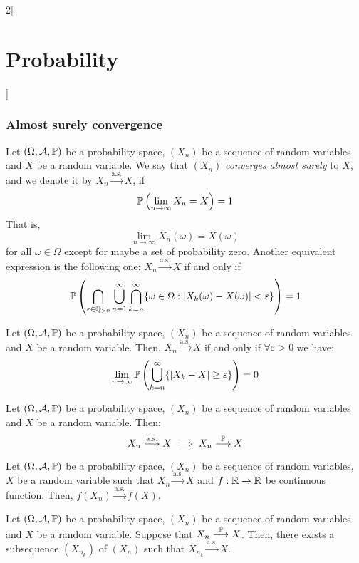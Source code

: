 \documentclass[../../../main.tex]{subfiles}
\begin{document}
\begin{multicols}{2}[\section{Probability}]
  \subsubsection{Almost surely convergence}
  \begin{definition}\label{P_as-conv}
    Let $(\Omega,\mathcal{A},\mathbb{P})$ be a probability space, $(X_n)$ be a sequence of random variables and $X$ be a random variable. We say that $(X_n)$ \emph{converges almost surely} to $X$, and we denote it by $X_n\overset{\text{a.s.}}{\longrightarrow} X$, if $$\mathbb{P}\left(\lim_{n\to\infty}X_n=X\right)=1$$ That is, $$\lim_{n\to\infty}X_n(\omega)=X(\omega)$$ for all $\omega\in\Omega$ except for maybe a set of probability zero. Another equivalent expression is the following one: $X_n\overset{\text{a.s.}}{\longrightarrow} X$ if and only if $$\mathbb{P}\left(\bigcap_{\varepsilon\in\mathbb{Q}_{>0}}\bigcup_{n=1}^\infty\bigcap_{k=n}^\infty\{\omega\in\Omega:|X_k(\omega)-X(\omega)|<\varepsilon\}\right)=1$$
  \end{definition}
  \begin{proposition}
    Let $(\Omega,\mathcal{A},\mathbb{P})$ be a probability space, $(X_n)$ be a sequence of random variables and $X$ be a random variable. Then, $X_n\overset{\text{a.s.}}{\longrightarrow} X$ if and only if $\forall \varepsilon>0$ we have: $$\lim_{n\to\infty}\mathbb{P}\left(\bigcup_{k=n}^\infty\{|X_k-X|\geq\varepsilon\}\right)=0$$
  \end{proposition}
  \begin{proposition}
    Let $(\Omega,\mathcal{A},\mathbb{P})$ be a probability space, $(X_n)$ be a sequence of random variables and $X$ be a random variable. Then:
    $$X_n\overset{\text{a.s.}}{\longrightarrow} X\implies X_n\overset{\mathbb{P}}{\longrightarrow} X$$
  \end{proposition}
  \begin{proposition}
    Let $(\Omega,\mathcal{A},\mathbb{P})$ be a probability space, $(X_n)$ be a sequence of random variables, $X$ be a random variable such that $X_n\overset{\text{a.s.}}{\longrightarrow} X$ and $f:\mathbb{R}\rightarrow\mathbb{R}$ be continuous function. Then, $f(X_n)\overset{\text{a.s.}}{\longrightarrow} f(X)$.
  \end{proposition}
  \begin{proposition}
    Let $(\Omega,\mathcal{A},\mathbb{P})$ be a probability space, $(X_n)$ be a sequence of random variables and $X$ be a random variable. Suppose that $X_n\overset{\mathbb{P}}{\longrightarrow} X$. Then, there exists a subsequence $(X_{n_k})$ of $(X_n)$ such that $X_{n_k}\overset{\text{a.s.}}{\longrightarrow} X$.

\end{proposition}
\end{multicols}
\end{document}
